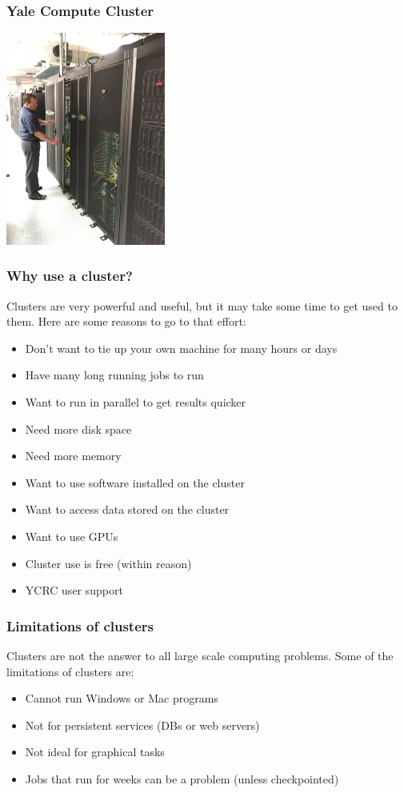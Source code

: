 \documentclass[10pt]{beamer}
\begin{document}
\begin{frame}[fragile]
\frametitle{Yale Compute Cluster}

\begin{center}
\includegraphics[height=7cm]{yalecluster.jpg}
\end{center}

\end{frame}

\begin{frame}
\frametitle{Why use a cluster?}
Clusters are very powerful and useful, but it may take some
time to get used to them.
Here are some reasons to go to that effort:

\begin{itemize}
\item Don't want to tie up your own machine for many hours or days
\item Have many long running jobs to run
\item Want to run in parallel to get results quicker
\item Need more disk space
\item Need more memory
\item Want to use software installed on the cluster
\item Want to access data stored on the cluster
\item Want to use GPUs
\item Cluster use is free (within reason)
\item YCRC user support
\end{itemize}
\end{frame}

\begin{frame}
\frametitle{Limitations of clusters}
Clusters are not the answer to all large scale computing problems.
Some of the limitations of clusters are:

\begin{itemize}
\item Cannot run Windows or Mac programs
\item Not for persistent services (DBs or web servers)
\item Not ideal for graphical tasks
\item Jobs that run for weeks can be a problem (unless checkpointed)
\end{itemize}
\end{frame}
\end{document}
